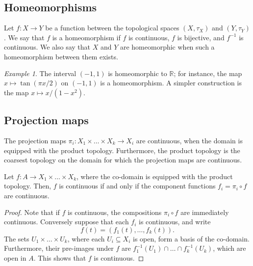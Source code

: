 \documentclass[11pt]{article}
\newcommand{\R}{\mathbb{R}}
\theoremstyle{definition}
\theoremstyle{remark}
\newtheorem*{example}{Example}
\numberwithin{equation}{section}
\begin{document}
    \subsection{Homeomorphisms}

    \begin{definition}
        Let $f\colon X \to Y$ be a function between the topological spaces $(X,
        \tau_X)$ and $(Y, \tau_Y)$. We say that $f$ is a homeomorphism if $f$ is
        continuous, $f$ is bijective, and $f^{-1}$ is continuous. We also say that
        $X$ and $Y$ are homeomorphic when such a homeomorphism between them exists.
    \end{definition}
    \begin{example}
        The interval $(-1, 1)$ is homeomorphic to $\R$; for instance, the map $x
        \mapsto \tan(\pi x/ 2)$ on $(-1, 1)$ is a homeomorphism. A simpler
        construction is the map $x \mapsto x / (1 - x^2)$.
    \end{example}

    
    \subsection{Projection maps}

    \begin{theorem}
        The projection maps $\pi_i\colon X_1\times \dots \times X_k \to X_i$ are
        continuous, when the domain is equipped with the product topology.
        Furthermore, the product topology is the coarsest topology on the domain for
        which the projection maps are continuous.
    \end{theorem}

    \begin{lemma}
        Let $f\colon A \to X_1 \times \dots \times X_k$, where the co-domain is
        equipped with the product topology. Then, $f$ is continuous if and only if
        the component functions $f_i = \pi_i\circ f$ are continuous.
    \end{lemma}
    \begin{proof}
        Note that if $f$ is continuous, the compositions $\pi_i\circ f$ are
        immediately continuous. Conversely suppose that each $f_i$ is continuous, and
        write \[
            f(t) = (f_1(t), \dots, f_k(t)).
        \] The sets $U_1 \times \dots \times U_k$, where each $U_i \subseteq X_i$ is
        open, form a basis of the co-domain. Furthermore, their pre-images under $f$
        are $f_1^{-1}(U_1) \cap \dots \cap f_k^{-1}(U_k)$, which are open in $A$.
        This shows that $f$ is continuous.
    \end{proof}
\end{document}
